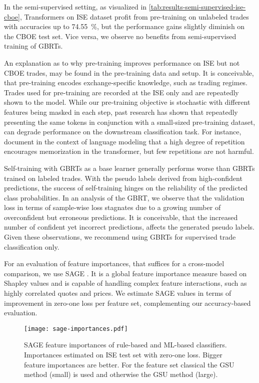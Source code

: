 In the semi-supervised setting, as visualized in \cref{tab:results-semi-supervised-ise-cboe}, Transformers on \gls{ISE} dataset profit from pre-training on unlabeled trades with accuracies up to \SI{74.55}{\percent}, but the performance gains slightly diminish on the \gls{CBOE} test set. Vice versa, we observe no benefits from semi-supervised training of \glspl{GBRT}.

An explanation as to why pre-training improves performance on \gls{ISE} but not \gls{CBOE} trades, may be found in the pre-training data and setup. It is conceivable, that pre-training encodes exchange-specific knowledge, such as trading regimes. Trades used for pre-training are recorded at the \gls{ISE} only and are repeatedly shown to the model. While our pre-training objective is stochastic with different features being masked in each step, past research has shown that repeatedly presenting the same tokens in conjunction with a small-sized pre-training dataset, can degrade performance on the downstream classification task. For instance, \textcite[][]{raffelExploringLimitsTransfer2020} document in the context of language modeling that a high degree of repetition encourages memorization in the transformer, but few repetitions are not harmful.

Self-training with \glspl{GBRT} as a base learner generally performs worse than \glspl{GBRT} trained on labeled trades. With the pseudo labels derived from high-confident predictions, the success of self-training hinges on the reliability of the predicted class probabilities. In an analysis of the \gls{GBRT}, we observe that the validation loss in terms of sample-wise loss stagnates due to a growing number of overconfident but erroneous predictions. It is conceivable, that the increased number of confident yet incorrect predictions, affects the generated pseudo labels. Given these observations, we recommend using \glspl{GBRT} for supervised trade classification only. 

For an evaluation of feature importances, that suffices for a cross-model comparison, we use \gls{SAGE} \autocite{covertUnderstandingGlobalFeature2020}. It is a global feature importance measure based on Shapley values and is capable of handling complex feature interactions, such as highly correlated quotes and prices. We estimate \gls{SAGE} values in terms of improvement in zero-one loss per feature set, complementing our accuracy-based evaluation.

\begin{figure}[h]
    \centering
    \texttt{[image: sage-importances.pdf]}
    \caption[ Feature Importances]{\gls{SAGE} feature importances of rule-based and \gls{ML}-based classifiers. Importances estimated on \gls{ISE} test set with zero-one loss. Bigger feature importances are better. For the feature set classical the \gls{GSU} method (small) is used and otherwise the \gls{GSU} method (large).}
    \label{fig:sage-importances}
\end{figure}


